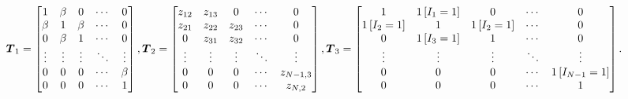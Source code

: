 \documentclass[lettersize,journal]{IEEEtran}
\theoremstyle{remark}
\begin{document}
\begin{figure}[t]
	\centering
	\begin{footnotesize}
		\begin{equation}
			\hspace{-0.4mm}\boldsymbol{T}_1 =
			\begin{bmatrix}
				1     & \beta & 0     & \cdots     & 0     \\
				\beta & 1     & \beta & \cdots     & 0     \\
				0     & \beta & 1     & \cdots     & 0     \\
				\vdots& \vdots& \vdots& \ddots & \vdots\\
				0     & 0     & 0     & \cdots  &\beta \\
				0     & 0     & 0     & \cdots  & 1     \\
			\end{bmatrix}, 
			\boldsymbol{T}_2 =
			\begin{bmatrix}
				z_{12} & z_{13} & 0     & \cdots    & 0     \\
				z_{21} & z_{22} & z_{23} & \cdots     & 0     \\
				0      & z_{31} & z_{32} & \cdots     & 0     \\
				\vdots & \vdots & \vdots & \ddots &  \vdots\\
				0      & 0      & 0      & \cdots &  z_{N-1,3}\\
				0      & 0      & 0      & \cdots &  z_{N,2}   \\
			\end{bmatrix}, 
			\boldsymbol{T}_3 = \begin{bmatrix}
				1 & 1\left[I_1=1\right] & 0     & \cdots      & 0     \\
				1\left[I_2=1\right] & 1 & 1\left[I_2=1\right] & \cdots     & 0     \\
				0 & 1\left[I_3=1\right] & 1 & \cdots      & 0     \\
				\vdots & \vdots & \vdots & \ddots  & \vdots\\
				0 & 0 & 0 & \cdots  & 1\left[I_{N-1}=1\right] \\
				0 & 0 & 0 & \cdots  & 1     \\
			\end{bmatrix}. \label{T}
		\end{equation}
	\end{footnotesize}
	\vspace{-5mm}
\end{figure}
\end{document}
